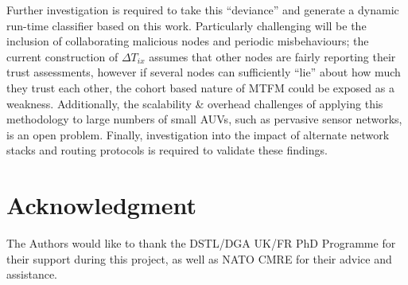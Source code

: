 \documentclass[conference]{IEEEtran}
\begin{document}
Further investigation is required to take this ``deviance'' and generate a dynamic run-time classifier based on this work. 
Particularly challenging will be the inclusion of collaborating malicious nodes and periodic misbehaviours; the current construction of $\Delta T_{ix}$ assumes that other nodes are fairly reporting their trust assessments, however if several nodes can sufficiently ``lie'' about how much they trust each other, the cohort based nature of MTFM could be exposed as a weakness.
Additionally, the scalability \& overhead challenges of applying this methodology to large numbers of small AUVs, such as pervasive sensor networks, is an open problem. Finally, investigation into the impact of alternate network stacks and routing protocols is required to validate these findings.






\section*{Acknowledgment}

The Authors would like to thank the DSTL/DGA UK/FR PhD Programme for their support during this project, as well as NATO CMRE for their advice and assistance.

\balance



\end{document}
